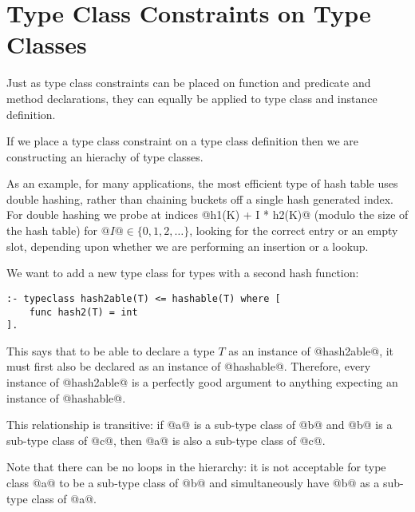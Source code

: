 \section{Type Class Constraints on Type Classes}

Just as type class constraints can be placed on function and predicate
and method declarations, they can equally be applied to type class and 
instance definition.

If we place a type class constraint on a type class definition then we
are constructing an hierachy of type classes.

As an example, for many applications, the most efficient type of hash
table uses double hashing, rather than chaining buckets off a single
hash generated index.  For double hashing we probe at indices @h1(K) + I
* h2(K)@ (modulo the size of the hash table) for $@I@ \in \{0, 1, 2,
\ldots\}$, looking for the correct entry or an empty slot, depending
upon whether we are performing an insertion or a lookup.

We want to add a new type class for types with a second hash function:
\begin{verbatim}
:- typeclass hash2able(T) <= hashable(T) where [
    func hash2(T) = int
].
\end{verbatim}
This says that to be able to declare a type $T$ as an instance of
@hash2able@, it must first also be declared as an instance of
@hashable@.  Therefore, every instance of @hash2able@ is a
perfectly good argument to anything expecting an instance of @hashable@.

This relationship is transitive: if @a@ is a sub-type class of @b@ and
@b@ is a sub-type class of @c@, then @a@ is also a sub-type class of
@c@.

Note that there can be no loops in the hierarchy: it is not acceptable
for type class @a@ to be a sub-type class of @b@ and simultaneously have
@b@ as a sub-type class of @a@.

